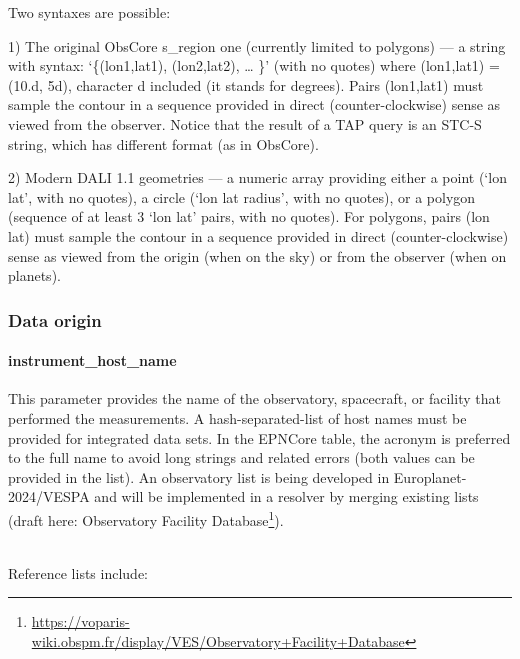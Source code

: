 \documentclass[11pt,a4paper]{ivoa}
\begin{document}
Two syntaxes are possible:

1) The original ObsCore s\_region one (currently limited to polygons)
— a string with syntax: `\{(lon1,lat1), (lon2,lat2), … \}' (with
no quotes) where (lon1,lat1) = (10.d, 5d), character d included (it
stands for degrees). Pairs (lon1,lat1) must sample the contour in a
sequence provided in direct (counter-clockwise) sense as viewed from
the observer. Notice that the result of a TAP query is an STC-S string,
which has different format (as in ObsCore).

2) Modern DALI 1.1 geometries — a numeric array providing either a point
(`lon lat', with no quotes), a circle (`lon lat radius', with no quotes),
or a polygon (sequence of at least 3 `lon lat' pairs, with no quotes). For
polygons, pairs (lon lat) must sample the contour in a sequence provided
in direct (counter-clockwise) sense as viewed from the origin (when on
the sky) or from the observer (when on planets).

\subsubsection{Data origin}

\paragraph{instrument\_host\_name}

This parameter provides the name of the observatory, spacecraft, or
facility that performed the measurements. A hash-separated-list of host
names must be provided for integrated data sets. In the EPNCore table, the
acronym is preferred to the full name to avoid long strings and related
errors (both values can be provided in the list). An observatory list
is being developed in Europlanet-2024/VESPA and will be implemented in
a resolver by merging existing lists (draft here: Observatory Facility
Database\footnote{\url{https://voparis-wiki.obspm.fr/display/VES/Observatory+Facility+Database}}).

\textbf{\\}
Reference lists include:
\end{document}
